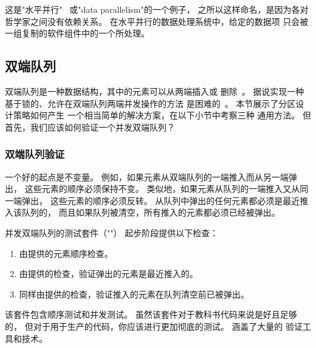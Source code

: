 这是"水平并行"~\cite{Inman85}
或"data parallelism"的一个例子，
之所以这样命名，是因为各对哲学家之间没有依赖关系。
在水平并行的数据处理系统中，给定的数据项
只会被一组复制的软件组件中的一个所处理。

\QuickQuizEnd

\subsection{双端队列}
\label{sec:SMPdesign:Double-Ended Queue}

双端队列是一种数据结构，其中的元素可以从两端插入或
删除~\cite{Knuth73}。
据说实现一种基于锁的、允许在双端队列两端并发操作的方法
是困难的~\cite{DanGrossman2007TMGCAnalogy}。
本节展示了分区设计策略如何产生
一个相当简单的解决方案，在以下小节中考察三种
通用方法。
但首先，我们应该如何验证一个并发双端队列？

\subsubsection{双端队列验证}
\label{sec:SMPdesign:Double-Ended Queue Validation}

一个好的起点是不变量。
例如，如果元素从双端队列的一端推入而从另一端弹出，
这些元素的顺序必须保持不变。
类似地，如果元素从队列的一端推入又从同一端弹出，
这些元素的顺序必须反转。
从队列中弹出的任何元素都必须是最近推入该队列的，
而且如果队列被清空，所有推入的元素都必须已经被弹出。

并发双端队列的测试套件（""）
起步阶段提供以下检查：

\begin{enumerate}
\item	由提供的元素顺序检查。
\item	由提供的检查，验证弹出的元素是最近推入的。
\item	同样由提供的检查，验证推入的元素在队列清空前已被弹出。
\end{enumerate}

该套件包含顺序测试和并发测试。
虽然该套件对于教科书代码来说是好且足够的，
但对于用于生产的代码，你应该进行更加彻底的测试。
涵盖了大量的
验证工具和技术。

